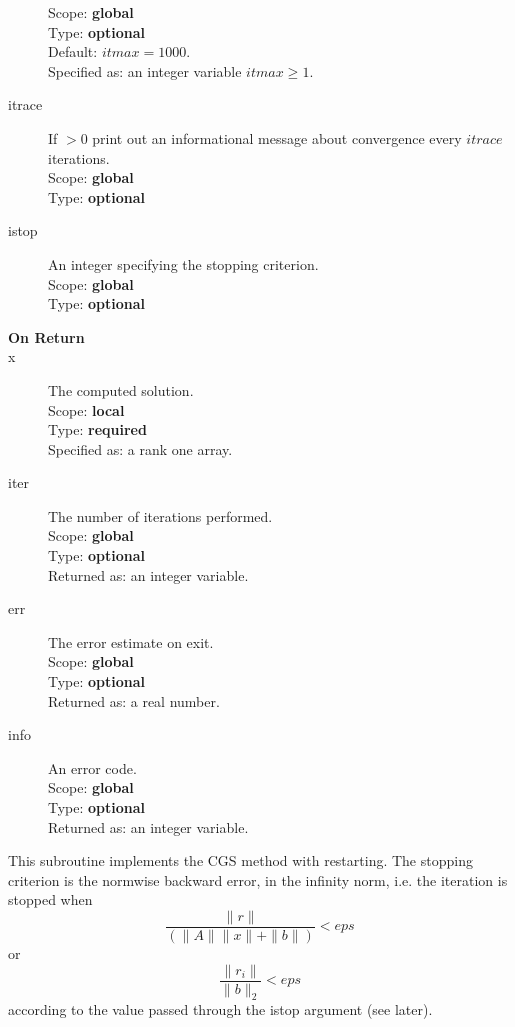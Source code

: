 \begin{description}
Scope: {\bf global} \\
Type: {\bf optional}\\
Default: $itmax = 1000$.\\
Specified as: an integer variable $itmax \ge 1$.
\item[itrace] If $>0$  print out an informational message about
  convergence  every $itrace$ iterations.\\ 
Scope: {\bf global} \\
Type: {\bf optional}\\
\item[istop]  An integer specifying the stopping criterion.\\
Scope: {\bf global} \\
Type: {\bf optional}\\

\item[\bf On Return] 
\item[x] The computed solution. \\
Scope: {\bf local} \\
Type: {\bf required}\\
Specified as: a rank one array.
\item[iter]  The number of iterations performed.\\
Scope: {\bf global} \\
Type: {\bf optional}\\
Returned  as: an integer variable.
\item[err]  The error estimate on exit.\\
Scope: {\bf global} \\
Type: {\bf optional}\\
Returned  as: a real number.
\item[info]  An error code.\\
Scope: {\bf global} \\
Type: {\bf optional}\\
Returned  as: an integer variable.
\end{description}
%
%


This subroutine implements the CGS method with restarting. The
stopping criterion is the normwise backward error, in the infinity
norm, i.e. the iteration is stopped when 
\[ \frac{\|r\|}{(\|A\|\|x\|+\|b\|)} < eps \]
or
\[ \frac{\|r_i\|}{\|b\|_2} < eps \]
according to the value passed through the  istop argument (see later).


